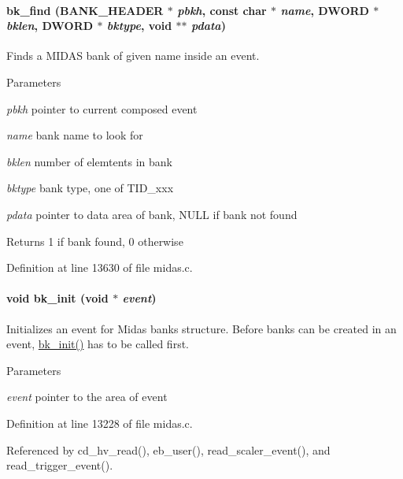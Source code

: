 \paragraph[{bk\_\-find}]{ bk\_\-find ({\bf BANK\_\-HEADER} $\ast$ {\em pbkh}, \/  const char $\ast$ {\em name}, \/  {\bf DWORD} $\ast$ {\em bklen}, \/  {\bf DWORD} $\ast$ {\em bktype}, \/  void $\ast$$\ast$ {\em pdata})}\hfill\label{group__bkfunctionc_ga5ecb1d77784b02c3f79684ab816d0ea7}
Finds a MIDAS bank of given name inside an event. 
\begin{DoxyParams}{Parameters}
\item[{\em pbkh}]pointer to current composed event \item[{\em name}]bank name to look for \item[{\em bklen}]number of elemtents in bank \item[{\em bktype}]bank type, one of TID\_\-xxx \item[{\em pdata}]pointer to data area of bank, NULL if bank not found \end{DoxyParams}
\begin{DoxyReturn}{Returns}
1 if bank found, 0 otherwise 
\end{DoxyReturn}


Definition at line 13630 of file midas.c.
\paragraph[{bk\_\-init}]{\setlength{\rightskip}{0pt plus 5cm}void bk\_\-init (void $\ast$ {\em event})}\hfill\label{group__bkfunctionc_gac6fadde40824dbf7bd70abedd29be2bd}
Initializes an event for Midas banks structure. Before banks can be created in an event, \hyperlink{group__bkfunctionc_gac6fadde40824dbf7bd70abedd29be2bd}{bk\_\-init()} has to be called first. 
\begin{DoxyParams}{Parameters}
\item[{\em event}]pointer to the area of event \end{DoxyParams}


Definition at line 13228 of file midas.c.

Referenced by cd\_\-hv\_\-read(), eb\_\-user(), read\_\-scaler\_\-event(), and read\_\-trigger\_\-event().
